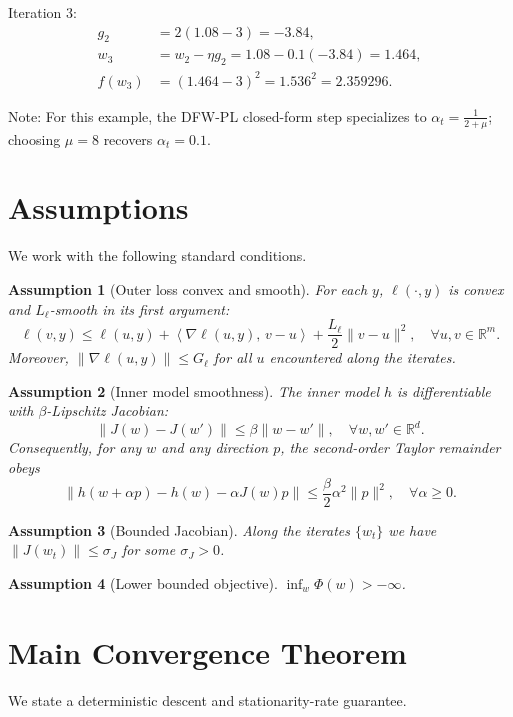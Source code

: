 \documentclass[11pt]{article}
\newtheorem{assumption}{Assumption}
\newcommand{\R}{\mathbb{R}}
\newcommand{\inner}[2]{\left\langle #1,\, #2 \right\rangle}
\begin{document}
Iteration 3:
\[
\begin{aligned}
g_2 &= 2(1.08-3) = -3.84,\\
w_3 &= w_2 - \eta g_2 = 1.08 - 0.1(-3.84) = 1.464,\\
f(w_3) &= (1.464-3)^2 = 1.536^2 = 2.359296.
\end{aligned}
\]

Note: For this example, the DFW-PL closed-form step specializes to $\alpha_t=\frac{1}{2+\mu}$; choosing $\mu=8$ recovers $\alpha_t=0.1$.

\section*{Assumptions}
We work with the following standard conditions.

\begin{assumption}[Outer loss convex and smooth]\label{asmp:ell}
For each $y$, $\ell(\cdot,y)$ is convex and $L_\ell$-smooth in its first argument:
\[
\ell(v,y) \le \ell(u,y) + \inner{\nabla \ell(u,y)}{v-u} + \frac{L_\ell}{2}\|v-u\|^2,\quad \forall u,v\in\R^m.
\]
Moreover, $\|\nabla \ell(u,y)\| \le G_\ell$ for all $u$ encountered along the iterates.
\end{assumption}

\begin{assumption}[Inner model smoothness]\label{asmp:h}
The inner model $h$ is differentiable with $\beta$-Lipschitz Jacobian:
\[
\|J(w)-J(w')\| \le \beta \|w-w'\|,\quad \forall w,w'\in\R^d.
\]
Consequently, for any $w$ and any direction $p$, the second-order Taylor remainder obeys
\[
\|h(w+\alpha p)-h(w)-\alpha J(w)p\| \le \frac{\beta}{2}\alpha^2\|p\|^2,\quad \forall \alpha\ge 0.
\]
\end{assumption}

\begin{assumption}[Bounded Jacobian]\label{asmp:J}
Along the iterates $\{w_t\}$ we have $\|J(w_t)\|\le \sigma_J$ for some $\sigma_J>0$.
\end{assumption}

\begin{assumption}[Lower bounded objective]\label{asmp:lower}
$\inf_{w}\Phi(w) > -\infty$.
\end{assumption}

\section*{Main Convergence Theorem}
We state a deterministic descent and stationarity-rate guarantee.
\end{document}

